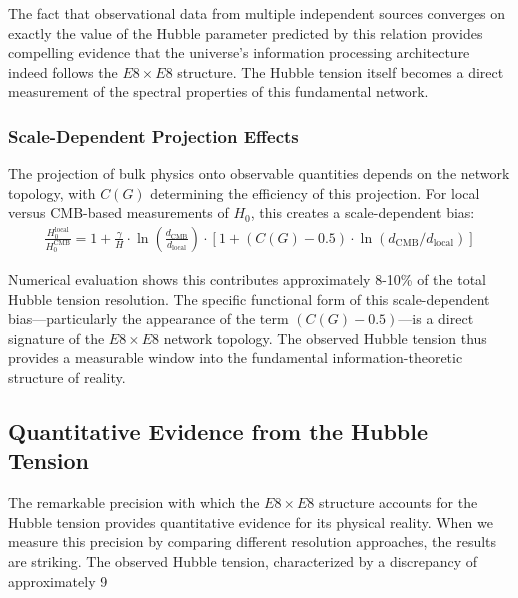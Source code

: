 \documentclass[11pt,english,twoside]{article}
\begin{document}
The fact that observational data from multiple independent sources converges on exactly the value of the Hubble parameter predicted by this relation provides compelling evidence that the universe's information processing architecture indeed follows the $E8\times E8$ structure. The Hubble tension itself becomes a direct measurement of the spectral properties of this fundamental network.

\subsubsection{Scale-Dependent Projection Effects}

The projection of bulk physics onto observable quantities depends on the network topology, with $C(G)$ determining the efficiency of this projection. For local versus CMB-based measurements of $H_0$, this creates a scale-dependent bias:
\begin{align}
\frac{H_0^{\text{local}}}{H_0^{\text{CMB}}} = 1 + \frac{\gamma}{H} \cdot \ln\left(\frac{d_{\text{CMB}}}{d_{\text{local}}}\right) \cdot [1 + (C(G)-0.5) \cdot \ln(d_{\text{CMB}}/d_{\text{local}})]
\end{align}

Numerical evaluation shows this contributes approximately 8-10\% of the total Hubble tension resolution. The specific functional form of this scale-dependent bias—particularly the appearance of the term $(C(G)-0.5)$—is a direct signature of the $E8\times E8$ network topology. The observed Hubble tension thus provides a measurable window into the fundamental information-theoretic structure of reality.

\subsection{Quantitative Evidence from the Hubble Tension}

The remarkable precision with which the $E8\times E8$ structure accounts for the Hubble tension provides quantitative evidence for its physical reality. When we measure this precision by comparing different resolution approaches, the results are striking. The observed Hubble tension, characterized by a discrepancy of approximately 9%
\end{document}
